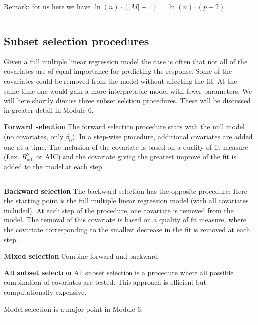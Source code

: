 \documentclass[]{article}
\begin{document}
Remark: for us here we have
\(\ln(n)\cdot (\lvert M\rvert +1)=\ln(n)\cdot (p+2)\)

\begin{center}\rule{0.5\linewidth}{\linethickness}\end{center}

\hypertarget{subset-selection-procedures}{%
\subsection{Subset selection
procedures}\label{subset-selection-procedures}}

Given a full multiple linear regression model the case is often that not
all of the covariates are of equal importance for predicting the
response. Some of the covariates could be removed from the model without
affecting the fit. At the same time one would gain a more interpretable
model with fewer parameters. We will here shortly discuss three subset
selction procedures. These will be discussed in greater detail in Module
6.

\textbf{Forward selection} The forward selection procedure stars with
the null model (no covariates, only \(\beta_0\)). In a step-wise
procedure, additional covariates are added one at a time. The inclusion
of the covariate is based on a quality of fit measure (f.ex.
\(R^2_{\text{adj}}\) or AIC) and the covariate giving the greatest
improve of the fit is added to the model at each step.

\begin{center}\rule{0.5\linewidth}{\linethickness}\end{center}

\textbf{Backward selection} The backward selection has the opposite
procedure: Here the starting point is the full multiple linear
regression model (with all covariates included). At each step of the
procedure, one covariate is removed from the model. The removal of this
covariate is based on a quality of fit measure, where the covariate
corresponding to the smallest decrease in the fit is removed at each
step.

\textbf{Mixed selection} Combine forward and backward.

\textbf{All subset selection} All subset selection is a procedure where
all possible combination of covariates are tested. This approach is
efficient but computationally expensive.

Model selection is a major point in Module 6.

\begin{center}\rule{0.5\linewidth}{\linethickness}\end{center}
\end{document}

